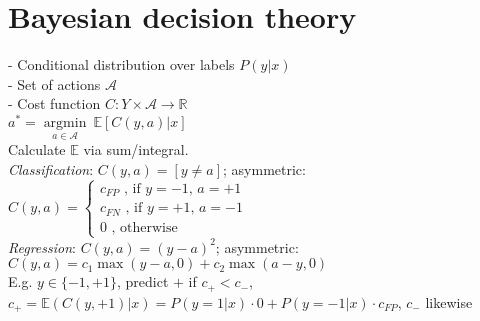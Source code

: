 \section*{Bayesian decision theory}
\noindent - Conditional distribution over labels $P(y|x)$\\
- Set of actions $\mathcal{A}$\\
- Cost function $C:Y\times \mathcal{A} \rightarrow \mathbb{R}$\\
$a^* = \underset{a \in \mathcal{A}}{\operatorname{argmin}} ~ \mathbb{E}[C(y,a)|x]$\\
Calculate $\mathbb{E}$ via sum/integral.\\
\emph{Classification}: $C(y,a) = [y \not = a]$; asymmetric: \\
$C(y,a) =
 \begin{cases}
 	c_{FP} \text{ , if $y=-1$, $a=+1$}\\
		c_{FN} \text{ , if $y=+1$, $a=-1$}\\
		0 \text{ , otherwise}
 \end{cases}$\\
 \emph{Regression}:  $C(y,a) = (y-a)^2$; asymmetric: $C(y,a) = c_1 \max(y-a,0) + c_2 \max(a-y,0)$\\
E.g. $y \in \{-1,+1\}$, predict $+$ if $c_+ < c_-$, $c_+ = \mathbb{E}(C(y, +1)|x) = P(y = 1|x) \cdot 0 + P(y = -1|x) \cdot c_{FP}$, $c_-$ likewise



